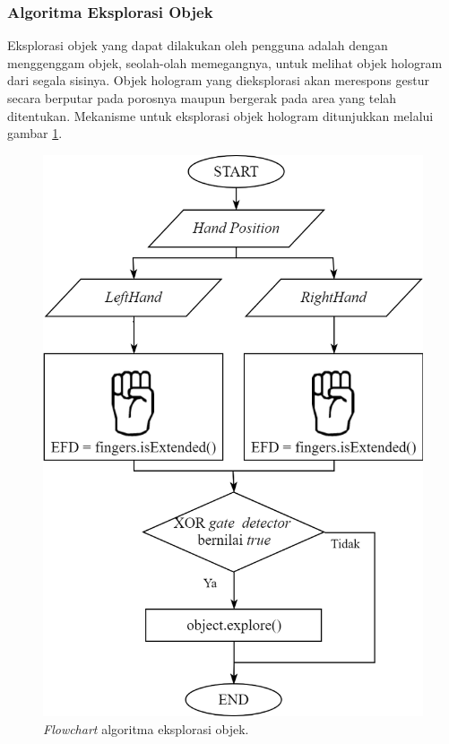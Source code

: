 		\subsubsection{Algoritma Eksplorasi Objek} \label{section:eksplorasi}
		\vspace{0.5ex}
			Eksplorasi objek yang dapat dilakukan oleh pengguna adalah dengan menggenggam objek, seolah-olah memegangnya, untuk melihat objek hologram dari segala sisinya. Objek hologram yang dieksplorasi akan merespons gestur secara berputar pada porosnya maupun bergerak pada area yang telah ditentukan. Mekanisme untuk eksplorasi objek hologram ditunjukkan melalui gambar \ref{fig:flow_eksplorasi}.
			\begin{figure} [H]
				\includegraphics[scale=0.2]{img/bab3/flow_eksplorasi.png}
				\caption{\textit{Flowchart} algoritma eksplorasi objek.}
				\label{fig:flow_eksplorasi}
			\end{figure}
			
